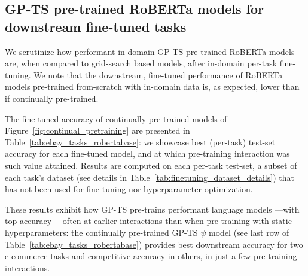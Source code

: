 
\subsection{GP-TS pre-trained RoBERTa models for downstream fine-tuned tasks}
\label{ssec:downstream}

We scrutinize how performant in-domain GP-TS pre-trained RoBERTa models are,
when compared to grid-search based models,
after in-domain per-task fine-tuning.
We note that the downstream, fine-tuned performance of RoBERTa models pre-trained from-scratch with in-domain data is, as expected, lower than if continually pre-trained.

The fine-tuned accuracy of continually pre-trained models
of Figure~\ref{fig:continual_pretraining} are presented in Table~\ref{tab:ebay_tasks_robertabase}:
we showcase best (per-task) test-set accuracy for each fine-tuned model,
and at which pre-training interaction was such value attained.
Results are computed on each per-task test-set,
\ie a subset of each task's dataset (see details in Table~\ref{tab:finetuning_dataset_details})
that has not been used for fine-tuning nor hyperparameter optimization.



These results exhibit how GP-TS pre-trains performant language models ---with top accuracy---
often at earlier interactions than when pre-training with static hyperparameters:
\eg the continually pre-trained GP-TS $\psi$ model
(see last row of Table~\ref{tab:ebay_tasks_robertabase})
provides best downstream accuracy for two e-commerce tasks and competitive accuracy in others,
in just a few pre-training interactions.

